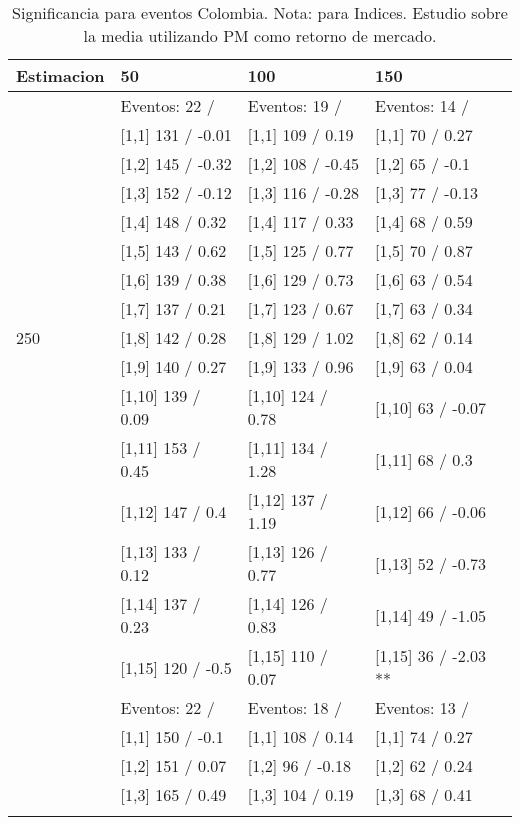 \begin{table}

\caption{Significancia para eventos Colombia. Nota: para Indices. Estudio sobre la media utilizando PM como retorno de mercado.}
\centering
\begin{tabular}[t]{llll}
\toprule
Estimacion & 50 & 100 & 150\\
\midrule
 & Eventos:  22 / & Eventos:  19 / & Eventos:  14 /\\
 & {}[1,1] 131  / -0.01 & {}[1,1] 109  / 0.19 & {}[1,1] 70  / 0.27\\
 & {}[1,2] 145  / -0.32 & {}[1,2] 108  / -0.45 & {}[1,2] 65  / -0.1\\
 & {}[1,3] 152  / -0.12 & {}[1,3] 116  / -0.28 & {}[1,3] 77  / -0.13\\
 & {}[1,4] 148  / 0.32 & {}[1,4] 117  / 0.33 & {}[1,4] 68  / 0.59\\
\addlinespace
 & {}[1,5] 143  / 0.62 & {}[1,5] 125  / 0.77 & {}[1,5] 70  / 0.87\\
 & {}[1,6] 139  / 0.38 & {}[1,6] 129  / 0.73 & {}[1,6] 63  / 0.54\\
 & {}[1,7] 137  / 0.21 & {}[1,7] 123  / 0.67 & {}[1,7] 63  / 0.34\\
250 & {}[1,8] 142  / 0.28 & {}[1,8] 129  / 1.02 & {}[1,8] 62  / 0.14\\
 & {}[1,9] 140  / 0.27 & {}[1,9] 133  / 0.96 & {}[1,9] 63  / 0.04\\
\addlinespace
 & {}[1,10] 139  / 0.09 & {}[1,10] 124  / 0.78 & {}[1,10] 63  / -0.07\\
 & {}[1,11] 153  / 0.45 & {}[1,11] 134  / 1.28 & {}[1,11] 68  / 0.3\\
 & {}[1,12] 147  / 0.4 & {}[1,12] 137  / 1.19 & {}[1,12] 66  / -0.06\\
 & {}[1,13] 133  / 0.12 & {}[1,13] 126  / 0.77 & {}[1,13] 52  / -0.73\\
 & {}[1,14] 137  / 0.23 & {}[1,14] 126  / 0.83 & {}[1,14] 49  / -1.05\\
\addlinespace
 & {}[1,15] 120  / -0.5 & {}[1,15] 110  / 0.07 & {}[1,15] 36  / -2.03 **\\
 & Eventos:  22 / & Eventos:  18 / & Eventos:  13 /\\
 & {}[1,1] 150  / -0.1 & {}[1,1] 108  / 0.14 & {}[1,1] 74  / 0.27\\
 & {}[1,2] 151  / 0.07 & {}[1,2] 96  / -0.18 & {}[1,2] 62  / 0.24\\
 & {}[1,3] 165  / 0.49 & {}[1,3] 104  / 0.19 & {}[1,3] 68  / 0.41\\
\addlinespace

\end{tabular}
\end{table}
